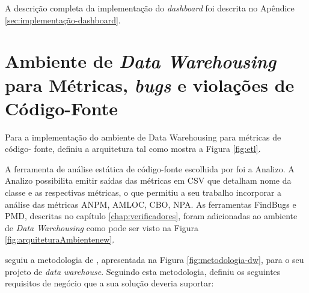 A descrição completa da implementação do \textit{dashboard} foi descrita no Apêndice \ref{sec:implementação-dashboard}.

\section{Ambiente de \textit{Data Warehousing} para Métricas, \textit{bugs} e violações de Código-Fonte}


Para a implementação do ambiente de Data Warehousing para métricas de código-
fonte,  definiu a arquitetura tal como mostra a Figura \ref{fig:etl}.

A ferramenta de análise estática de código-fonte escolhida por  foi a Analizo. A Analizo  possibilita emitir saídas das métricas em CSV que detalham nome da classe e as respectivas métricas, o que permitiu a seu trabalho incorporar a análise das métricas ANPM, AMLOC, CBO, NPA. As ferramentas FindBugs e PMD, descritas no capítulo \ref{chap:verificadores}, foram adicionadas ao ambiente de \textit{Data Warehousing} como pode ser visto na Figura \ref{fig:arquiteturaAmbientenew}. 

 seguiu a metodologia de \cite{Kimball2002}, apresentada na Figura \ref{fig:metodologia-dw}, para o seu projeto de \textit{data warehouse}. Seguindo esta metodologia,  definiu os seguintes requisitos de negócio que a sua solução deveria suportar:


